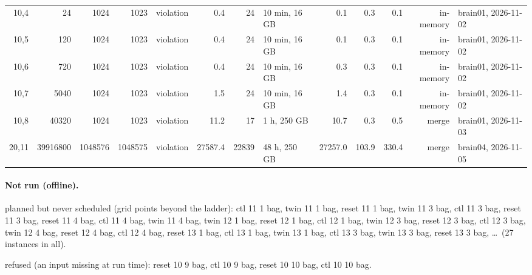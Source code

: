 \documentclass[10pt]{article}
\begin{document}
\begin{longtable}{@{}rrrrlrrlrrrrl@{}}
\color{red} 10,4 & 24 & 1024 & 1023 & violation & 0.4 & 24 & 10 min, 16 GB & 0.1 & 0.3 & 0.1 & in-memory & brain01, 2026-11-02 \\
\color{red} 10,5 & 120 & 1024 & 1023 & violation & 0.4 & 24 & 10 min, 16 GB & 0.1 & 0.3 & 0.1 & in-memory & brain01, 2026-11-02 \\
\color{red} 10,6 & 720 & 1024 & 1023 & violation & 0.4 & 24 & 10 min, 16 GB & 0.3 & 0.3 & 0.1 & in-memory & brain01, 2026-11-02 \\
\color{red} 10,7 & 5040 & 1024 & 1023 & violation & 1.5 & 24 & 10 min, 16 GB & 1.4 & 0.3 & 0.1 & in-memory & brain01, 2026-11-02 \\
\color{blue} 10,8 & 40320 & 1024 & 1023 & violation & 11.2 & 17 & 1 h, 250 GB & 10.7 & 0.3 & 0.5 & merge & brain01, 2026-11-03 \\
\color{blue} 20,11 & 39916800 & 1048576 & 1048575 & violation & 27587.4 & 22839 & 48 h, 250 GB & 27257.0 & 103.9 & 330.4 & merge & brain04, 2026-11-05 \\
\bottomrule
\end{longtable}
\paragraph{Not run (offline).}
planned but never scheduled (grid points beyond the ladder): ctl 11 1 bag, twin 11 1 bag, reset 11 1 bag, twin 11 3 bag, ctl 11 3 bag, reset 11 3 bag, reset 11 4 bag, ctl 11 4 bag, twin 11 4 bag, twin 12 1 bag, reset 12 1 bag, ctl 12 1 bag, twin 12 3 bag, reset 12 3 bag, ctl 12 3 bag, twin 12 4 bag, reset 12 4 bag, ctl 12 4 bag, reset 13 1 bag, ctl 13 1 bag, twin 13 1 bag, ctl 13 3 bag, twin 13 3 bag, reset 13 3 bag, \ldots\ (27 instances in all).\par
refused (an input missing at run time): reset 10 9 bag, ctl 10 9 bag, reset 10 10 bag, ctl 10 10 bag.\par
\end{document}
